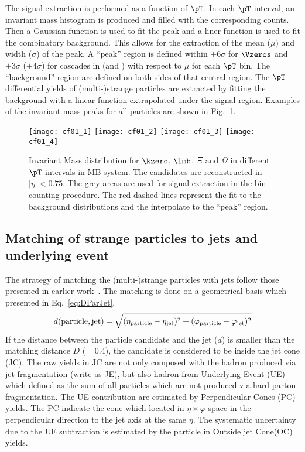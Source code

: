The signal extraction is performed as a function of $\pT$.
In each $\pT$ interval, an invariant mass histogram is produced and filled with the corresponding counts.
Then a Gaussian function is used to fit the peak and a liner function is used to fit the combinatory background.
This allows for the extraction of the mean ($\mu$) and width ($\sigma$) of the peak.
A ``peak'' region is defined within $\pm 6\sigma$ for $\Vzeros$ and $\pm 3\sigma$ ($\pm 4\sigma$) for cascades in \pp (and \pPb) with respect to $\mu$ for each $\pT$ bin.
The ``background'' region are defined on both sides of that central region.
The $\pT$-differential yields of (multi-)strange particles are extracted by fitting the background with a linear function extrapolated under the signal region.
Examples of the invariant mass peaks for all particles are shown in Fig.~\ref{fig:InvM}.
\begin{figure}[!ht]
\begin{center}
\texttt{[image: cf01\_1]}
\texttt{[image: cf01\_2]}
\texttt{[image: cf01\_3]}
\texttt{[image: cf01\_4]}
\caption{Invariant Mass distribution for $\kzero$, $\lmb$, $\Xi$ and $\Omega$ in different $\pT$ intervals in MB \pPb system. The candidates are reconstructed in $|\eta|<0.75$.
The grey areas are used for signal extraction in the bin counting procedure.
The red dashed lines represent the fit to the background distributions and the interpolate to the ``peak'' region.}
\label{fig:InvM}
\end{center}
\end{figure}

\subsection{Matching of strange particles to jets and underlying event}%
\label{sec:ParJetMatch}

The strategy of matching the (multi-)strange particles with jets follow those presented in earlier work~\cite{V0injet}.
The matching is done on a geometrical basis which presented in Eq.~\ref{eq:DParJet}.
\begin{equation}
	d(\mathrm{particle, jet}) = \sqrt{(\eta_\mathrm{particle} -\eta_{\rm jet})^{2} + (\varphi_\mathrm{particle} -\varphi_{\rm jet})^{2}}
	\label{eq:DParJet}
\end{equation}
If the distance between the particle candidate and the jet ($d$) is smaller than the matching distance $D$ (= 0.4), the candidate is considered to be inside the jet cone (JC).
The raw yields in JC are not only composed with the hadron produced via jet fragmentation (write as JE), but also hadron from Underlying Event (UE) which defined as the sum of all particles which are not produced via hard parton fragmentation.
The UE contribution are estimated by Perpendicular Cones (PC) yields.
The PC indicate the cone which located in $\eta \times \varphi$ space in the perpendicular direction to the jet axis at the same $\eta$.
The systematic uncertainty due to the UE subtraction is estimated by the particle in Outside jet Cone(OC) yields. 

